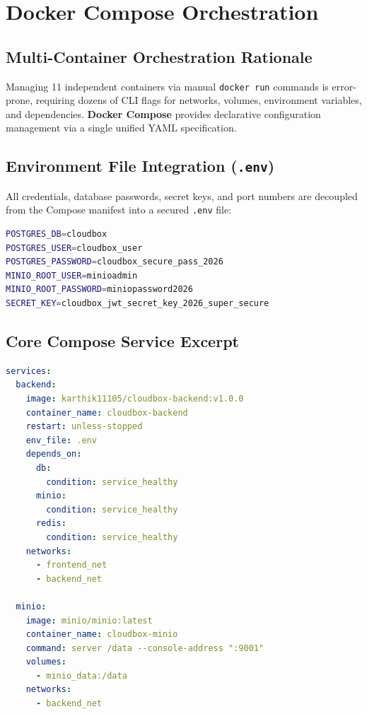 \documentclass[11pt,a4paper]{report}
\begin{document}
\clearpage

\chapter{Docker Compose Orchestration}

\section{Multi-Container Orchestration Rationale}
Managing 11 independent containers via manual \texttt{docker run} commands is error-prone, requiring dozens of CLI flags for networks, volumes, environment variables, and dependencies. \textbf{Docker Compose} provides declarative configuration management via a single unified YAML specification.

\section{Environment File Integration (\texttt{.env})}
All credentials, database passwords, secret keys, and port numbers are decoupled from the Compose manifest into a secured \texttt{.env} file:
\begin{lstlisting}[language=bash]
POSTGRES_DB=cloudbox
POSTGRES_USER=cloudbox_user
POSTGRES_PASSWORD=cloudbox_secure_pass_2026
MINIO_ROOT_USER=minioadmin
MINIO_ROOT_PASSWORD=miniopassword2026
SECRET_KEY=cloudbox_jwt_secret_key_2026_super_secure
\end{lstlisting}

\section{Core Compose Service Excerpt}
\begin{lstlisting}[language=yaml]
services:
  backend:
    image: karthik11105/cloudbox-backend:v1.0.0
    container_name: cloudbox-backend
    restart: unless-stopped
    env_file: .env
    depends_on:
      db:
        condition: service_healthy
      minio:
        condition: service_healthy
      redis:
        condition: service_healthy
    networks:
      - frontend_net
      - backend_net

  minio:
    image: minio/minio:latest
    container_name: cloudbox-minio
    command: server /data --console-address ":9001"
    volumes:
      - minio_data:/data
    networks:
      - backend_net
\end{lstlisting}
\end{document}
